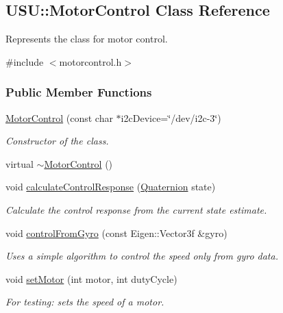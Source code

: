 \hypertarget{class_u_s_u_1_1_motor_control}{\subsection{\-U\-S\-U\-:\-:\-Motor\-Control \-Class \-Reference}
\label{class_u_s_u_1_1_motor_control}
}


\-Represents the class for motor control.  




{\ttfamily \#include $<$motorcontrol.\-h$>$}

\subsubsection*{\-Public \-Member \-Functions}
\begin{DoxyCompactItemize}
\item 
\hyperlink{class_u_s_u_1_1_motor_control_a85b6eed3bdd71d61a690395156999888}{\-Motor\-Control} (const char $\ast$i2c\-Device=\char`\"{}/dev/i2c-\/3\char`\"{})
\begin{DoxyCompactList}\small\item\em \-Constructor of the class. \end{DoxyCompactList}\item 
virtual \hyperlink{class_u_s_u_1_1_motor_control_a5bc78d24ed52a012a3f81cd3b62216f3}{$\sim$\-Motor\-Control} ()
\item 
void \hyperlink{class_u_s_u_1_1_motor_control_a40b7e40ce5bfb7fb0dea6c0a75d1eb5e}{calculate\-Control\-Response} (\hyperlink{class_u_s_u_1_1_quaternion}{\-Quaternion} state)
\begin{DoxyCompactList}\small\item\em \-Calculate the control response from the current state estimate. \end{DoxyCompactList}\item 
void \hyperlink{class_u_s_u_1_1_motor_control_acd56c7bf602f8162edaa219e902b1937}{control\-From\-Gyro} (const \-Eigen\-::\-Vector3f \&gyro)
\begin{DoxyCompactList}\small\item\em \-Uses a simple algorithm to control the speed only from gyro data. \end{DoxyCompactList}\item 
void \hyperlink{class_u_s_u_1_1_motor_control_ad08369ed288a7816de1b3c423684f0da}{set\-Motor} (int motor, int duty\-Cycle)
\begin{DoxyCompactList}\small\item\em \-For testing\-: sets the speed of a motor. \end{DoxyCompactList}\item 

\end{DoxyCompactItemize}
